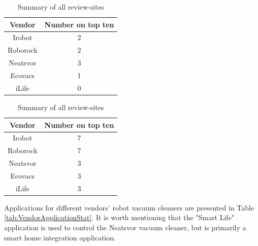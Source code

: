 \begin{table}[H]
\begin{subtable}[b]{0.45\linewidth}
\begin{tabular}{|c|c|}
            \hline
            \textbf{Vendor}    & \textbf{Number on top ten} \\ \hline
            Irobot      & 2                 \\                   \hline
            Roborock    & 2                 \\                   \hline
            Neatsvor    & 3                 \\                   \hline
            Ecovacs     & 1                 \\                   \hline
            iLife       & 0                 \\                   \hline
        \end{tabular}
    \end{subtable}
    \hspace{0.5cm}
    \begin{subtable}[b]{0.45\linewidth}
        \centering
        \caption{Summary of all review-sites}
        \begin{tabular}{|c|c|}
            \hline
            \textbf{Vendor}    & \textbf{Number on top ten} \\ \hline
            Irobot      & 7                 \\                   \hline
            Roborock    & 7                 \\                   \hline
            Neatsvor    & 3                 \\                   \hline
            Ecovacs     & 3                 \\                   \hline
            iLife       & 3                 \\                   \hline
        \end{tabular}
    \end{subtable}
    \label{tab:Robotreviewsites}
\end{table}

Applications for different vendors' robot vacuum cleaners are presented in Table \ref{tab:VendorApplicationStat}. It is worth mentioning that the "Smart Life" application is used to control the Neatsvor vacuum cleaner, but is primarily a smart home integration application. 


